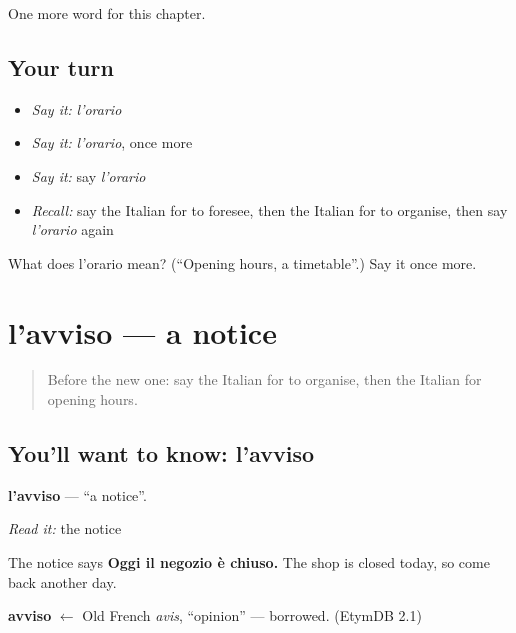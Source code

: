 \begin{grammarlens}[title={What you've built}]
One more word for this chapter.
\end{grammarlens}

\subsection*{Your turn}
\begin{itemize}
\raggedright
  \item \emph{Say it:} \emph{l'orario}
  \item \emph{Say it:} \emph{l'orario}, once more
  \item \emph{Say it:} say \emph{l'orario}
  \item \emph{Recall:} say the Italian for to foresee, then the Italian for to organise, then say \emph{l'orario} again
\end{itemize}

\begin{tcolorbox}[breakable,colback=teal!4,colframe=teal!35!black,title={Before you move on}]
What does l'orario mean? (\textquotedblleft{}Opening hours, a timetable\textquotedblright{}.) Say it once more.
\end{tcolorbox}
\section[l'avviso]{l'avviso — a notice}

\label{lesson:IT-C139-lavviso}



\begin{quote}
Before the new one: say the Italian for to organise, then the Italian for opening hours.
\end{quote}

\subsection*{You'll want to know: l'avviso}
\textbf{l'avviso} — \textquotedblleft{}a notice\textquotedblright{}.

\emph{Read it:} the notice

The notice says \textbf{Oggi il negozio è chiuso.} The shop is closed today, so come back another day.

\begin{cousinweb}
\textbf{avviso} $\leftarrow$ Old French \emph{avis}, \textquotedblleft{}opinion\textquotedblright{} — borrowed. (EtymDB 2.1)
\end{cousinweb}

